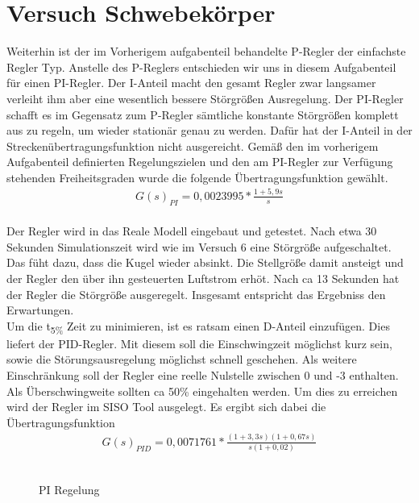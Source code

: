 \documentclass[10pt]{scrartcl}
\begin{document}
\section{Versuch Schwebekörper}
Weiterhin ist der im Vorherigem aufgabenteil behandelte P-Regler der einfachste Regler Typ. Anstelle des P-Reglers entschieden wir uns in diesem Aufgabenteil für einen PI-Regler. Der I-Anteil macht den gesamt Regler zwar langsamer verleiht ihm aber eine wesentlich bessere Störgrößen Ausregelung. Der PI-Regler schafft es im Gegensatz zum P-Regler sämtliche konstante Störgrößen komplett aus zu regeln, um wieder stationär genau zu werden. Dafür hat der I-Anteil in der Streckenübertragungsfunktion nicht ausgereicht. Gemäß den im vorherigem Aufgabenteil definierten Regelungszielen und den am PI-Regler zur Verfügung stehenden Freiheitsgraden wurde die folgende Übertragungsfunktion gewählt. 
\begin{align}
   G(s)_{PI}=0,0023995*\frac{1+5,9s}{s}
\end{align} \\
Der Regler wird in das Reale Modell eingebaut und getestet.
Nach etwa 30 Sekunden Simulationszeit wird wie im Versuch 6 eine Störgröße aufgeschaltet. Das füht dazu, dass die Kugel wieder absinkt. Die Stellgröße damit ansteigt und der Regler den über ihn gesteuerten Luftstrom erhöt. Nach ca 13 Sekunden hat der Regler die Störgröße ausgeregelt. Insgesamt entspricht das Ergebniss den Erwartungen.\\
Um die t\textsubscript{5\%} Zeit zu minimieren, ist es ratsam einen D-Anteil einzufügen. Dies liefert der PID-Regler.
Mit diesem soll die Einschwingzeit möglichst kurz sein, sowie die Störungsausregelung möglichst schnell geschehen. Als weitere Einschränkung soll der Regler eine reelle Nulstelle zwischen 0 und -3 enthalten. Als Überschwingweite sollten ca 50\% eingehalten werden.
Um dies zu erreichen wird der Regler im SISO Tool ausgelegt.
Es ergibt sich dabei die Übertragungsfunktion
\begin{align}
   G(s)_{PID}=0,0071761*\frac{(1+3,3s)(1+0,67s)}{s(1+0,02)}
\end{align} \\
\begin{figure} [H]
\begin{center}
\caption{PI Regelung } 
\end{center}
\end{figure}
\end{document}
